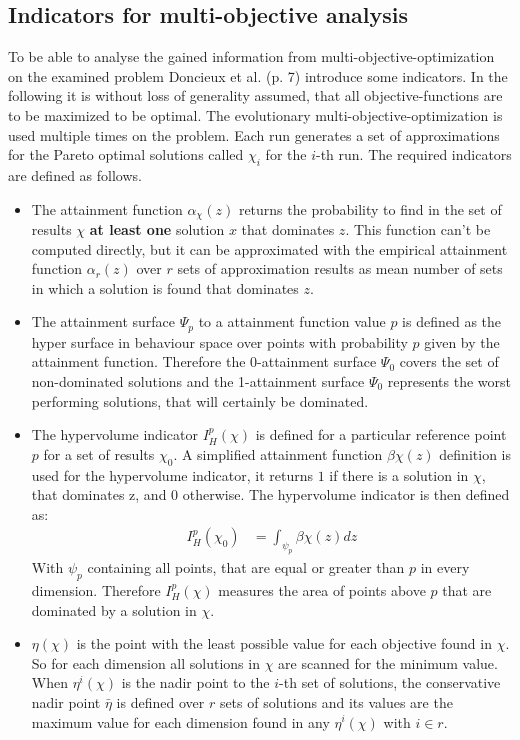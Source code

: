 \documentclass[12pt,twoside]{article}
\theoremstyle{plain}
\theoremstyle{definition}
\theoremstyle{remark}
\begin{document}
\subsection{Indicators for multi-objective analysis}
\label{back:indicators}
To be able to analyse the gained information from multi-objective-optimization on the examined problem Doncieux et al. \cite{doncieux2015multi} (p. 7) introduce some indicators.
In the following it is without loss of generality assumed, that all objective-functions are to be maximized to be optimal.
The evolutionary multi-objective-optimization is used multiple times on the problem. Each run generates a set of approximations for the Pareto optimal solutions called $\chi_i$ for the $i$-th run.
The required indicators are defined as follows.
\begin{itemize}
	\item The attainment function $\alpha_\chi(z)$ returns the probability to find in the set of results $\chi$ \textbf{at least one} solution $x$ that dominates $z$. This function can't be computed directly, but it can be approximated with the empirical attainment function $\alpha_r(z)$ over $r$ sets of approximation results as mean number of sets in which a solution is found that dominates $z$.
	\item The attainment surface $\Psi_p$ to a attainment function value $p$ is defined as the hyper surface in behaviour space over points with probability $p$ given by the attainment function.
	Therefore the 0-attainment surface $\Psi_0$ covers the set of non-dominated solutions and the 1-attainment surface $\Psi_0$ represents the worst performing solutions, that will certainly be dominated.
	\item The hypervolume indicator $I^p_H(\chi)$ is defined for a particular reference point $p$ for a set of results $\chi_0$. A simplified attainment function $\beta\chi(z)$ definition is used for the hypervolume indicator, it returns $1$ if there is a solution in $\chi$, that dominates z, and $0$ otherwise. The hypervolume indicator is then defined as:
	\begin{align*}
		I^p_H(\chi_0) &= \int_{\psi_p}\beta\chi(z) dz
	\end{align*}
	With $\psi_p$ containing all points, that are equal or greater than $p$ in every dimension.
	Therefore $I^p_H(\chi)$ measures the area of points above $p$ that are dominated by a solution in $\chi$.
	\item $\eta(\chi)$ is the point with the least possible value for each objective found in $\chi$. So for each dimension all solutions in $\chi$ are scanned for the minimum value.
	When $\eta^i(\chi)$ is the nadir point to the $i$-th set of solutions, the conservative nadir point $\bar{\eta}$ is defined over $r$ sets of solutions and its values are the maximum value for each dimension found in any $\eta^i(\chi)$ with $i\in r$.
\end{itemize} 
\end{document}
